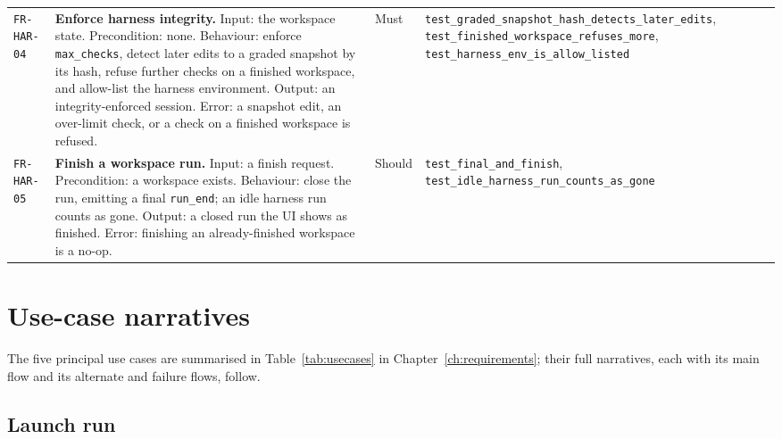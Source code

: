 \begin{longtable}{@{}>{\raggedright\arraybackslash}p{}>{\raggedright\arraybackslash}p{}p{}>{\raggedright\arraybackslash}p{}@{}}
\texttt{FR-HAR-04} & \textbf{Enforce harness integrity.} Input: the workspace
state. Precondition: none. Behaviour: enforce \texttt{max\_checks}, detect later
edits to a graded snapshot by its hash, refuse further checks on a finished
workspace, and allow-list the harness environment. Output: an integrity-enforced
session. Error: a snapshot edit, an over-limit check, or a check on a finished
workspace is refused. & Must & \texttt{test\_graded\_snapshot\_hash\_detects\_later\_edits},
\texttt{test\_finished\_workspace\_refuses\_more},
\texttt{test\_harness\_env\_is\_allow\_listed} \\
\addlinespace[2pt]

\texttt{FR-HAR-05} & \textbf{Finish a workspace run.} Input: a finish request.
Precondition: a workspace exists. Behaviour: close the run, emitting a final
\texttt{run\_end}; an idle harness run counts as gone. Output: a closed run the UI
shows as finished. Error: finishing an already-finished workspace is a no-op. &
Should & \texttt{test\_final\_and\_finish}, \texttt{test\_idle\_harness\_run\_counts\_as\_gone} \\
\bottomrule
\end{longtable}

\section{Use-case narratives}

The five principal use cases are summarised in Table~\ref{tab:usecases} in
Chapter~\ref{ch:requirements}; their full narratives, each with its main flow
and its alternate and failure flows, follow.

\subsection{Launch run}

